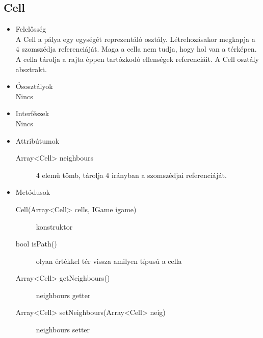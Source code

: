 \subsection{Cell}
\begin{itemize}
\item Felelősség\\
A Cell a pálya egy egységét reprezentáló osztály. Létrehozásakor megkapja a 4 szomszédja referenciáját. Maga a cella nem tudja, hogy hol van a térképen. A cella tárolja a rajta éppen tartózkodó ellenségek referenciáit. A Cell osztály absztrakt.
\item Ősosztályok\\
Nincs
\item Interfészek\\
Nincs
\item Attribútumok\\
	\begin{description}
		\item[Array<Cell> neighbours] 4 elemű tömb, tárolja 4 irányban a szomszédjai referenciáját.

		
	\end{description}
\item Metódusok\\
	\begin{description}
		
		\item[Cell(Array<Cell> cells, IGame igame)] konstruktor
		\item[bool isPath()] olyan értékkel tér vissza amilyen típusú a cella 
		\item[Array<Cell> getNeighbours()] neighbours getter
		\item[Array<Cell> setNeighbours(Array<Cell> neig)] neighbours setter
		
		
	\end{description}
\end{itemize}
